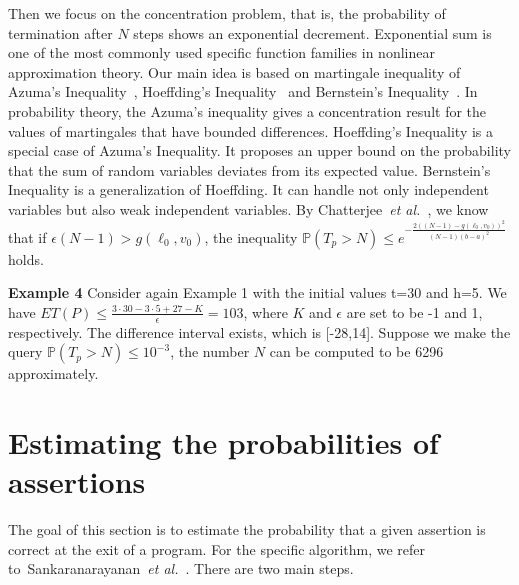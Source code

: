 \documentclass[conference]{IEEEtran}
\begin{document}
Then we focus on the concentration problem, that is, the probability of termination after $N$ steps shows an exponential decrement. Exponential sum is one of the most commonly used specific function families in nonlinear approximation theory. Our main idea is based on martingale inequality of Azuma's Inequality~\cite{Azuma1967}, Hoeffding's Inequality~\cite{Hoeffding1963,McDiarmid1998Concentration}  and Bernstein's Inequality~\cite{Bennett1962,McDiarmid1998Concentration}. In probability theory, the Azuma's inequality gives a concentration result for the values of martingales that have bounded differences. Hoeffding's Inequality is a special case of Azuma's Inequality. It proposes an upper bound on the probability that the sum of random variables deviates from its expected value. Bernstein's Inequality is a generalization of Hoeffding. It can handle not only independent variables but also weak independent variables. By Chatterjee~\emph{et al.}~\cite{cha2015algorithmic}, we know that if $\epsilon(N-1) > g(\ell_0,v_0)$, the inequality $\mathbb{P}(T_p > N)\leq e^{-\frac{2((N-1)-g(\ell_0,v_0))^2}{(N-1)(b-a)^2}}$ holds. 

\textbf{Example 4} Consider again Example 1 with the initial values t=30 and h=5. We have  $ET(P) \leq \frac{3\cdot 30-3\cdot 5+27-K}{\epsilon}=103$, where $K$ and $\epsilon$ are set to be -1 and 1, respectively. The difference interval exists, which is [-28,14]. Suppose we make the query $\mathbb{P}(T_p > N)\leq 10^{-3}$, the number $N$ can be computed to be 6296  approximately.

\section{Estimating the probabilities of assertions}
The goal of this section is to estimate the probability that a given assertion is correct at the exit of a program. For the specific algorithm, we refer to~Sankaranarayanan~\emph{et al.}~\cite{Sankaranarayanan2013Static}. There are two main steps.
\end{document}
